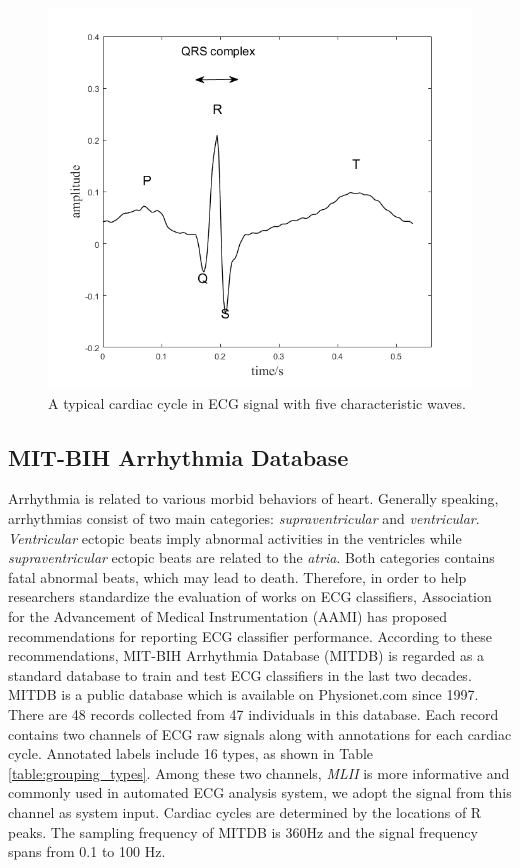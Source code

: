 \begin{figure}[t]
 	\centering
 	\includegraphics[scale=0.75]{Fig/cardiac_cycle.png}
 	\caption{A typical cardiac cycle in ECG signal with five characteristic waves.}
 	\label{fig:cardiac_cycle}
 \end{figure}

\subsection{MIT-BIH Arrhythmia Database}

Arrhythmia is related to various morbid behaviors of heart. Generally speaking, arrhythmias consist of two main categories: \textit{supraventricular} and \textit{ventricular}. \textit{Ventricular} ectopic beats imply abnormal activities in the ventricles while \textit{supraventricular} ectopic beats are related to the \textit{atria}\cite{houghton2014making}. Both categories contains fatal abnormal beats, which may lead to death\cite{ng2006treating}. Therefore, in order to help researchers standardize the evaluation of works on ECG classifiers, Association for the Advancement of Medical Instrumentation (AAMI) has proposed recommendations for reporting ECG classifier performance\cite{aami}. 
According to these recommendations, MIT-BIH Arrhythmia Database (MITDB) is regarded as a standard database to train and test ECG classifiers in the last two decades. MITDB is a public database which is available on Physionet.com \cite{physionet} since 1997\cite{mitdb}. There are 48 records collected from 47 individuals in this database. Each record contains two channels of ECG raw signals along with annotations for each cardiac cycle. Annotated labels include 16 types, as shown in Table \ref{table:grouping_types}. Among these two channels, \textit{MLII} is more informative and commonly used in automated ECG analysis system, we adopt the signal from this channel as system input\cite{karpagachelvi2010ecg}. Cardiac cycles are determined by the locations of R peaks. %
The sampling frequency of MITDB is 360Hz and the signal frequency spans from 0.1 to 100 Hz. 

